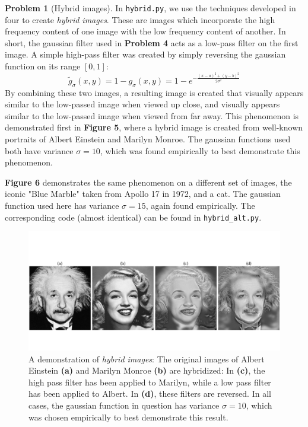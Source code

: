 \documentclass[10pt]{article}
\theoremstyle{plain}
\theoremstyle{definition}
\newtheorem{prob}{Problem}
\renewcommand{\tilde}[1]{\widetilde{#1}}%
\numberwithin{equation}{section}
\begin{document}
\hrulefill
\newpage
\begin{prob}[Hybrid images]
    In \texttt{hybrid.py}, we use the techniques developed in four to create \textit{hybrid images}.
    These are images which incorporate the high frequency content of one image
    with the low frequency content of another. In short, the gaussian filter used in 
    \textbf{Problem 4} acts as a low-pass filter on the first image. A simple high-pass filter was created by
    simply reversing the gaussian function on its range ${[0,1]}$:
    \[
            \tilde{g}_\sigma(x,y) = 1 - g_\sigma(x,y) = 1 - e^{-\frac{(x-a)^2 + (y-b)^2}{2\sigma^2}}
        \]
    By combining these two images, a resulting image is created that visually appears
    similar to the low-passed image when viewed up close, and visually appears similar to the
    low-passed image when viewed from far away. This phenomenon is demonstrated first in
    \textbf{Figure 5}, where a hybrid image is created from well-known portraits of Albert
    Einstein and Marilyn Monroe. The gaussian functions used both have variance $\sigma=10$, which 
    was found empirically to best demonstrate this phenomenon.
    
    \textbf{Figure 6} demonstrates the
    same phenomenon on a different set of images,
    the iconic "Blue Marble" taken from Apollo 17 in 1972, and a cat. The gaussian function used here
    has variance $\sigma=15$, again found empirically. The corresponding code (almost identical)
    can be found in \texttt{hybrid\_alt.py}.
    \begin{figure}[p]
    \begin{center}
        \includegraphics[width=\textwidth]{prob5}
        \caption{
        A demonstration of \textit{hybrid images}: The original images of Albert Einstein \textbf{(a)} and
        Marilyn Monroe \textbf{(b)} are hybridized: In \textbf{(c)}, the high pass filter has been
        applied to Marilyn, while a low pass filter has been applied to Albert.
        In \textbf{(d)}, these filters are reversed. In all cases, the gaussian function in question
        has variance $\sigma=10$, which was chosen empirically to best demonstrate this result.
            }
    \end{center}
\end{figure}


\end{prob}
\end{document}
